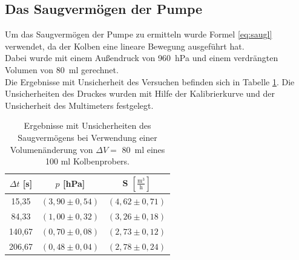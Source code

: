 \documentclass[a4paper,usenatbib]{aspdoc}
\begin{document}
            
        
        \subsection{Das Saugvermögen der Pumpe}\label{subsec:saug}
            Um das Saugvermögen der Pumpe zu ermitteln wurde Formel \ref{eq:saugl} verwendet, da der Kolben eine lineare Bewegung ausgeführt hat.\\
            Dabei wurde mit einem Außendruck von \SI{960}{\hecto\pascal} und einem verdrängten Volumen von \SI{80}{\milli\litre} gerechnet.\\
            Die Ergebnisse mit Unsicherheit des Versuchen befinden sich in Tabelle \ref{tab:saug}. Die Unsicherheiten des Druckes wurden mit Hilfe der Kalibrierkurve und der Unsicherheit des Multimeters festgelegt.
            
            \begin{table}
                \centering
                \begin{tabular}{c|c|c}
                    \multicolumn{1}{c}{$\Delta t$ [s]} & \multicolumn{1}{c}{$p$ [hPa]} & \multicolumn{1}{c}{S $[\frac{\mathrm{m}^3}{\mathrm{h}}]$}\\
                    \cmidrule(l){0-0}\cmidrule(lr){2-2}\cmidrule(lr){3-3}
                    \toprule
                     15,35  & $(3,90 \pm 0,54) $ & $(4,62 \pm 0,71) $ \\
                     84,33  & $(1,00 \pm 0,32)$ & $(3,26 \pm 0,18)  $ \\
                     140,67  & $(0,70 \pm 0,08)$ & $(2,73 \pm 0,12)  $ \\
                     206,67 & $(0,48 \pm 0,04)$ & $(2,78 \pm 0,24) $ \\
                    \bottomrule
                \end{tabular}
                \caption{Ergebnisse mit Unsicherheiten des Saugvermögens bei Verwendung einer Volumenänderung von $\Delta V = $ \SI{80}{\milli\litre} eines 100 ml Kolbenprobers.}
                \label{tab:saug}
            \end{table}
    
    
\end{document}
